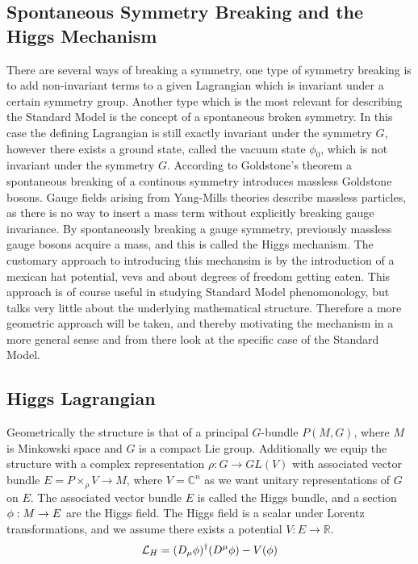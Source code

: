 \subsection{Spontaneous Symmetry Breaking and the Higgs Mechanism}
There are several ways of breaking a symmetry, one type of symmetry breaking is to add non-invariant terms to a given Lagrangian which is invariant under a certain symmetry group. Another type which is the most relevant for describing the Standard Model is the concept of a spontaneous broken symmetry. In this case the defining Lagrangian is still exactly invariant under the symmetry $G$, however there exists a ground state, called the vacuum state $\phi_{0}$, which is not invariant under the symmetry $G$. According to Goldstone's theorem a spontaneous breaking of a continous symmetry introduces massless Goldstone bosons. Gauge fields arising from Yang-Mills theories describe massless particles, as there is no way to insert a mass term without explicitly breaking gauge invariance. By spontaneously breaking a gauge symmetry, previously massless gauge bosons acquire a mass, and this is called the Higgs mechanism. The customary approach to introducing this mechansim is by the introduction of a mexican hat potential, vevs and about degrees of freedom getting eaten. This approach is of course useful in studying Standard Model phenomonology, but talks very little about the underlying mathematical structure. Therefore a more geometric approach will be taken, and thereby motivating the mechanism in a more general sense and from there look at the specific case of the Standard Model.

\subsection{Higgs Lagrangian}
Geometrically the structure is that of a principal $G$-bundle $P(M,G)$, where $M$ is Minkowski space and $G$ is a compact Lie group. Additionally we equip the structure with a complex representation $\rho:G\rightarrow GL(V)$ with associated vector bundle $E=P\times_{\rho} V\rightarrow M$, where $V=\mathbb{C}^{n}$ as we want unitary representations of $G$ on $E$. The associated vector bundle $E$ is called the Higgs bundle, and a section $\bold{\phi}:M\rightarrow E$ are the Higgs field. The Higgs field is a scalar under Lorentz transformations, and we assume there exists a potential $V:E\rightarrow \mathbb{R}$.
\begin{align*}
    \mathcal{L}_{H}=(D_{\mu}\bold{\phi})^{\dagger}(D^{\mu}\bold{\phi})-V(\bold{\phi})
\end{align*}


